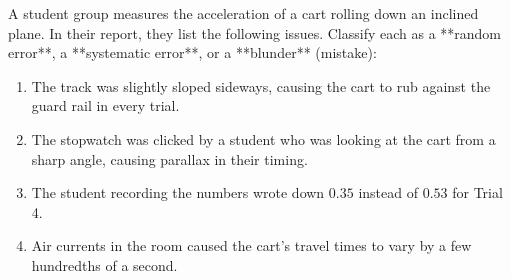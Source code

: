 \begin{whiteboard}
A student group measures the acceleration of a cart rolling down an inclined plane. In their report, they list the following issues. Classify each as a **random error**, a **systematic error**, or a **blunder** (mistake):
\begin{enumerate}[label=(\alph*), itemsep=1pt]
  \item The track was slightly sloped sideways, causing the cart to rub against the guard rail in every trial.
  \item The stopwatch was clicked by a student who was looking at the cart from a sharp angle, causing parallax in their timing.
  \item The student recording the numbers wrote down $0.35$ instead of $0.53$ for Trial 4.
  \item Air currents in the room caused the cart’s travel times to vary by a few hundredths of a second.
\end{enumerate}
\end{whiteboard}
